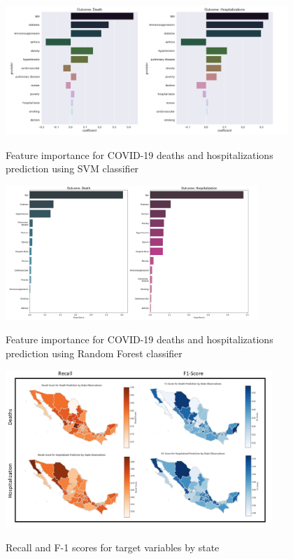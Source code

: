 \documentclass[hidelinks,10pt]{article}
\begin{document}
\begin{figure}[ht]
	\caption{Feature importance for COVID-19 deaths and hospitalizations prediction using SVM classifier }
	\centering
	\includegraphics[width=0.95\textwidth]{feat1}
	\label{fig:7}
\end{figure}
\begin{figure}[ht]
	\caption{Feature importance for COVID-19 deaths and hospitalizations prediction using Random Forest classifier}
	\centering
	\includegraphics[width=0.85\textwidth]{feat2}
	\label{fig:8}
\end{figure}
	\begin{figure}[ht]
		\caption{Recall and F-1 scores for target variables by state}
		\centering 
		\includegraphics[width=0.9\textwidth]{f1}
		\label{fig:9}
	\end{figure}
	
	
\end{document}
